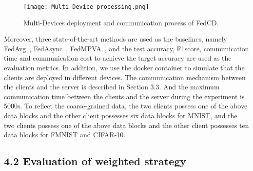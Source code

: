 \documentclass[twoside,twocolumn]{article}
\begin{document}
\begin{figure}
\centerline{\texttt{[image: Multi-Device processing.png]}}
\caption{Multi-Devices deployment and communication process of FedCD.} \label{fig3}
\end{figure}

	Moreover, three state-of-the-art methods are used as the baselines, namely FedAvg~\cite{mcmahan2017communication}, FedAsync~\cite{xie2019asynchronous}, FedMPVA~\cite{chen2021asynchronous}, and the test accuracy, F1score, communication time and communication cost to achieve the target accuracy are used as the evaluation metrics.
	In addition, we use the docker container to simulate that the clients are deployed in different devices. The communication mechanism between the clients and the server is described in Section 3.3. And the maximum communication time between the clients and the server during the experiment is 5000s. To reflect the coarse-grained data, the two clients possess one of the above data blocks and the other client possesses six data blocks for MNIST, and the two clients possess one of the above data blocks and the other client possesses ten data blocks for FMNIST and CIFAR-10.
%
\subsection{4.2 Evaluation of weighted strategy}
\end{document}

